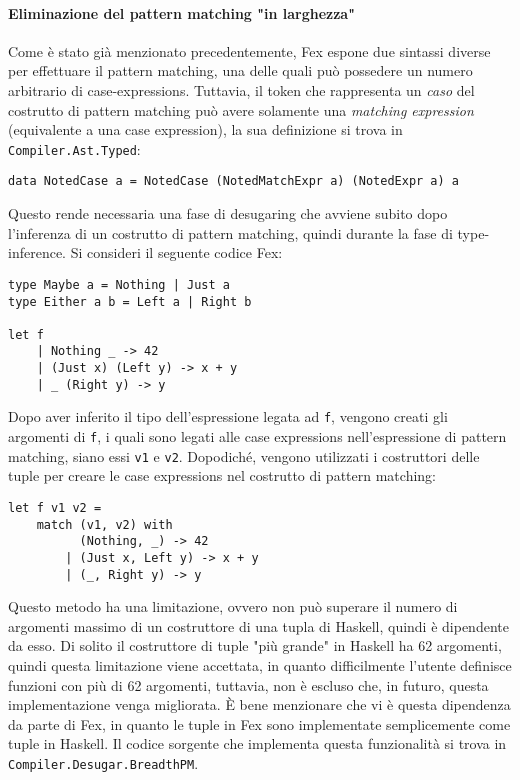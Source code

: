 \documentclass[10pt,a4paper]{article}
\begin{document}
\paragraph{Eliminazione del pattern matching "in larghezza"}
Come è stato già menzionato precedentemente, Fex espone due sintassi diverse per effettuare il pattern matching,
una delle quali può possedere un numero arbitrario di case-expressions. Tuttavia, il token che rappresenta un
\textit{caso} del costrutto di pattern matching può avere solamente una \textit{matching expression} (equivalente
a una case expression), la sua definizione si trova in \texttt{Compiler.Ast.Typed}:
\begin{lstlisting}
data NotedCase a = NotedCase (NotedMatchExpr a) (NotedExpr a) a
\end{lstlisting}
Questo rende necessaria una fase di desugaring che avviene subito dopo l'inferenza di un costrutto di pattern matching,
quindi durante la fase di type-inference. Si consideri il seguente codice Fex:
\begin{lstlisting}
type Maybe a = Nothing | Just a
type Either a b = Left a | Right b

let f
    | Nothing _ -> 42
    | (Just x) (Left y) -> x + y
    | _ (Right y) -> y
\end{lstlisting}
Dopo aver inferito il tipo dell'espressione legata ad \texttt{f}, vengono creati gli argomenti di \texttt{f}, i quali
sono legati alle case expressions nell'espressione di pattern matching, siano essi \texttt{v1} e \texttt{v2}. Dopodiché,
vengono utilizzati i costruttori delle tuple per creare le case expressions nel costrutto di pattern matching:
\begin{lstlisting}
let f v1 v2 =
    match (v1, v2) with
          (Nothing, _) -> 42
        | (Just x, Left y) -> x + y
        | (_, Right y) -> y
\end{lstlisting}
Questo metodo ha una limitazione, ovvero non può superare il numero di argomenti massimo di un costruttore di una tupla
di Haskell, quindi è dipendente da esso. Di solito il costruttore di tuple "più grande" in Haskell ha 62 argomenti, quindi
questa limitazione viene accettata, in quanto difficilmente l'utente definisce funzioni con più di 62 argomenti, tuttavia,
non è escluso che, in futuro, questa implementazione venga migliorata. \`E bene menzionare che vi è questa dipendenza da
parte di Fex, in quanto le tuple in Fex sono implementate semplicemente come tuple in Haskell. Il codice sorgente che
implementa questa funzionalità si trova in \texttt{Compiler.Desugar.BreadthPM}.
\end{document}
